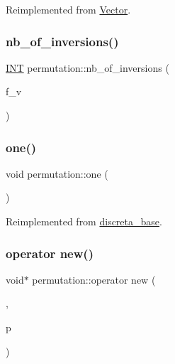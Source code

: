 Reimplemented from \mbox{\hyperlink{class_vector_a77dd4ded54124a6f928c411dc0960a73}{Vector}}.

\mbox{\label{classpermutation_a5846c6cfd8d2d64f4cb906425744f73f}} 
\subsubsection{\texorpdfstring{nb\+\_\+of\+\_\+inversions()}{nb\_of\_inversions()}}
{\footnotesize\ttfamily \mbox{\hyperlink{galois_8h_a09fddde158a3a20bd2dcadb609de11dc}{I\+NT}} permutation\+::nb\+\_\+of\+\_\+inversions (\begin{DoxyParamCaption}\item[{\mbox{\hyperlink{galois_8h_a09fddde158a3a20bd2dcadb609de11dc}{I\+NT}}}]{f\+\_\+v }\end{DoxyParamCaption})}

\mbox{\label{classpermutation_a358377181aea843bd774f0dfb3822b7f}} 
\subsubsection{\texorpdfstring{one()}{one()}}
{\footnotesize\ttfamily void permutation\+::one (\begin{DoxyParamCaption}{ }\end{DoxyParamCaption})\hspace{0.3cm}{\ttfamily [virtual]}}



Reimplemented from \mbox{\hyperlink{classdiscreta__base_a6f5d6422a0040950415db30e39dafd19}{discreta\+\_\+base}}.

\mbox{\label{classpermutation_ac2a11ded23f8715f7b091d033d4a3eb0}} 
\subsubsection{\texorpdfstring{operator new()}{operator new()}}
{\footnotesize\ttfamily void$\ast$ permutation\+::operator new (\begin{DoxyParamCaption}\item[{size\+\_\+t}]{,  }\item[{void $\ast$}]{p }\end{DoxyParamCaption})\hspace{0.3cm}{\ttfamily [inline]}}

